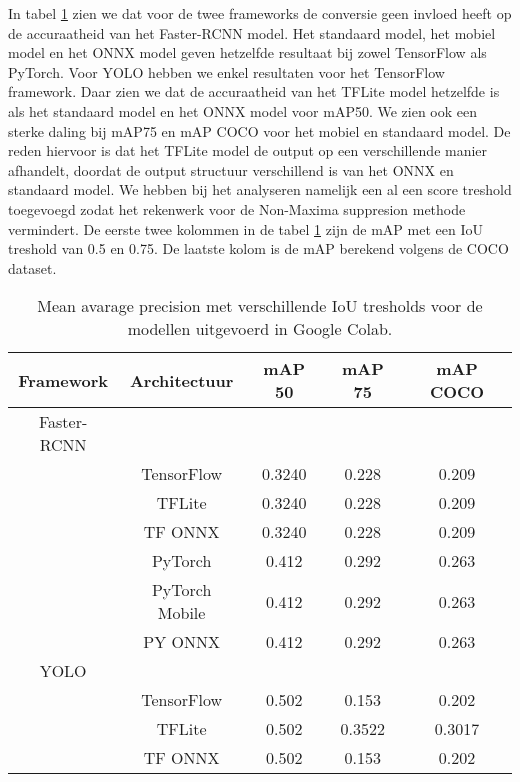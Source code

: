 In tabel \ref{tab:rcnn_acc} zien we dat voor de twee frameworks de conversie geen invloed heeft op de accuraatheid van het Faster-RCNN model.
Het standaard model, het mobiel model en het ONNX model geven hetzelfde resultaat bij zowel TensorFlow als PyTorch.
Voor YOLO hebben we enkel resultaten voor het TensorFlow framework.
Daar zien we dat de accuraatheid van het TFLite model hetzelfde is als het standaard model en het ONNX model voor mAP50.
We zien ook een sterke daling bij mAP75 en mAP COCO voor het mobiel en standaard model.
De reden hiervoor is dat het TFLite model de output op een verschillende manier afhandelt, doordat de output structuur verschillend is van het ONNX en standaard model.
We hebben bij het analyseren namelijk een al een score treshold toegevoegd zodat het rekenwerk voor de Non-Maxima suppresion methode vermindert.
De eerste twee kolommen in de tabel \ref{tab:rcnn_acc} zijn de mAP met een IoU treshold van 0.5 en 0.75.
De laatste kolom is de mAP berekend volgens de COCO dataset.
\begin{table}[!ht]
    \caption{Mean avarage precision met verschillende IoU tresholds voor de modellen uitgevoerd in Google Colab.}
\begin{tabular}{ccccc}
    \hline
    Framework & Architectuur & mAP 50 & mAP 75 & mAP COCO\\
    \hline
    Faster-RCNN & & & & \\
     & TensorFlow & 0.3240  & 0.228 & 0.209 \\
     & TFLite & 0.3240 & 0.228 & 0.209 \\
     & TF ONNX & 0.3240 & 0.228 & 0.209 \\
     & PyTorch & 0.412 & 0.292 & 0.263 \\
     & PyTorch Mobile & 0.412 & 0.292 & 0.263 \\
     & PY ONNX & 0.412 & 0.292 & 0.263 \\
    YOLO & & & & \\
     & TensorFlow & 0.502  & 0.153 & 0.202 \\
     & TFLite & 0.502 & 0.3522 & 0.3017 \\
     & TF ONNX & 0.502  & 0.153 & 0.202 \\
    \hline
\end{tabular}
\label{tab:rcnn_acc}
\end{table}

